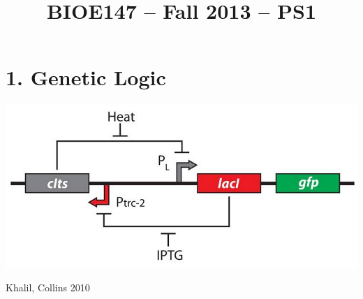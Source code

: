 \documentclass[11pt]{article}
\title{BIOE147 -- Fall 2013 -- PS1}
\author{\Name}
\newcommand\titlepagedecoration{%
\begin{tikzpicture}[remember picture,overlay,shorten >= -10pt]

\coordinate (aux1) at ([yshift=-15pt]current page.north east);
\coordinate (aux2) at ([yshift=-410pt]current page.north east);
\coordinate (aux3) at ([xshift=-4.5cm]current page.north east);
\coordinate (aux4) at ([yshift=-150pt]current page.north east);

\begin{scope}[titlepagecolor!40,line width=12pt,rounded corners=12pt]
\draw
  (aux1) -- coordinate (a)
  ++(225:5) --
  ++(-45:5.1) coordinate (b);
\draw[shorten <= -10pt]
  (aux3) --
  (a) --
  (aux1);
\draw[opacity=0.6,titlepagecolor,shorten <= -10pt]
  (b) --
  ++(225:2.2) --
  ++(-45:2.2);
\end{scope}
\draw[titlepagecolor,line width=8pt,rounded corners=8pt,shorten <= -10pt]
  (aux4) --
  ++(225:0.8) --
  ++(-45:0.8);
\begin{scope}[titlepagecolor!70,line width=6pt,rounded corners=8pt]
\draw[shorten <= -10pt]
  (aux2) --
  ++(225:3) coordinate[pos=0.45] (c) --
  ++(-45:3.1);
\draw
  (aux2) --
  (c) --
  ++(135:2.0) --
  ++(45:2.0) --
  ++(-45:2.5) coordinate[pos=0.3] (d);   
\draw 
  (d) -- +(45:1);
\end{scope}
\end{tikzpicture}
}
\begin{document}
\maketitle
\section*{1. Genetic Logic}

{\centering
  \includegraphics[scale=0.3, trim = 0mm 0mm 7mm 0mm, clip]{ps1_q1.png}\par
  Khalil, Collins 2010\par
}
\end{document}
